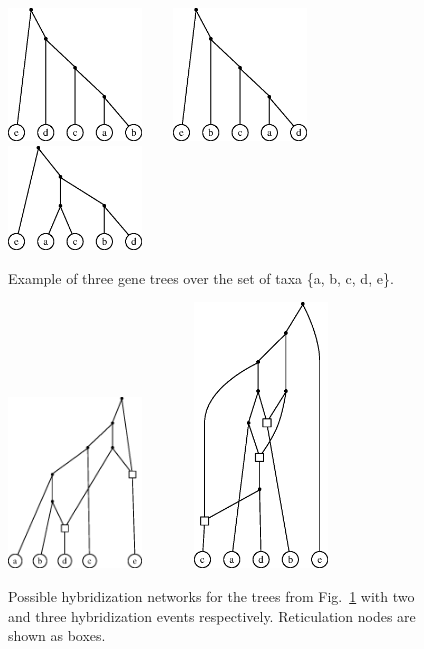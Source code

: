 \begin{figure}[t]
  \centering
  \includegraphics[width=1.4in]{img/inp1.eps}
  ~~~
  \includegraphics[width=1.4in]{img/inp2.eps}
  ~~~
  \includegraphics[width=1.4in]{img/inp3.eps}
  \caption{Example of three gene trees over the set of taxa \{a, b, c, d, e\}.}
  \label{input-example}
\end{figure}

\begin{figure}[t]
  \centering
  \includegraphics[width=1.4in]{img/ans.eps}
  ~~~~~~
  \includegraphics[width=1.4in]{img/ans3.eps}
  \caption{Possible hybridization networks for the trees from Fig.~\ref{input-example} with two and three hybridization events respectively. Reticulation nodes are shown as boxes.}
  \label{network-example}
\end{figure}